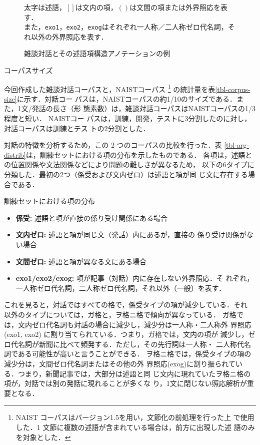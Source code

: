 \documentclass[japanese]{jnlp_1.4}
\begin{document}
\begin{figure}[b]

\caption{雑談対話とその述語項構造アノテーションの例}
\label{fig-chat-dialog}
\par\small
太字は述語，$[ ]$は文内の項，$( )$は文間の項または外界照応を表す．\\ 
また，\texttt{exo1}，\texttt{exo2}，\texttt{exog}はそれぞれ一人称／二人称ゼロ代名詞，それ以外の外界照応を表す．
\end{figure}
\begin{table}[b]
\caption{コーパスサイズ}
\label{tbl-corpus-size}

\end{table}

今回作成した雑談対話コーパスと，NAISTコーパス
\footnote{NAIST コーパスはバージョン1.5を用い，文節化の前処理を行った上
で使用した．1 文節に複数の述語が含まれている場合は，前方に出現した述
語のみを対象とした．} の統計量を表\ref{tbl-corpus-size}に示す．対話コー
パスは，NAISTコーパスの約1/10のサイズである．また，1文/発話の長さ（形
態素数）は，雑談対話コーパスはNAISTコーパスの1/3程度と短い． NAISTコー
パスは，訓練，開発，テストに3分割したのに対し，対話コーパスは訓練とテス
トの2分割とした．

対話の特徴を分析するため，この 2 つのコーパスの比較を行った．表
\ref{tbl-arg-distrib}は，訓練セットにおける項の分布を示したものである．
各項は，述語との位置関係や文法関係などにより問題の難しさが異なるため，
以下の6タイプに分類した．最初の2つ（係受および文内ゼロ）は述語と項が同
じ文に存在する場合である．

\begin{table}[t]
\caption{訓練セットにおける項の分布}
\label{tbl-arg-distrib}

\end{table}

\begin{itemize}
\item \textbf{係受:} 述語と項が直接の係り受け関係にある場合
\item \textbf{文内ゼロ:} 述語と項が同じ文（発話）内にあるが，直接の
係り受け関係がない場合
\item \textbf{文間ゼロ:} 述語と項が異なる文にある場合
\item \textbf{exo1/exo2/exog:} 項が記事（対話）内に存在しない外界照応．そ
れぞれ，一人称ゼロ代名詞，二人称ゼロ代名詞，それ以外（一般）を表す．
\end{itemize}

これを見ると，対話ではすべての格で，係受タイプの項が減少している．それ
以外のタイプについては，ガ格と，ヲ格ニ格で傾向が異なっている．
ガ格では，文内ゼロ代名詞も対話の場合に減少し，減少分は一人称・二人称外
界照応 (exo1, exo2) に割り当てられている．つまり，ガ格では，文内の項が
減少し，ゼロ代名詞が新聞に比べて頻発する．ただし，その先行詞は一人称・
二人称代名詞である可能性が高いと言うことができる．
ヲ格ニ格では，係受タイプの項の減少分は，文間ゼロ代名詞またはその他の外
界照応(exog)に割り振られている．つまり，新聞記事では，大部分は述語と同
じ文内に現れていたヲ格ニ格の項が，対話では別の発話に現れることが多くな
り，1文に閉じない照応解析が重要となる．
\end{document}
